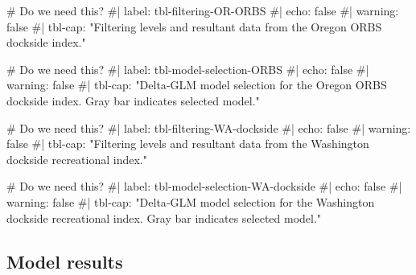 \documentclass[
]{scrartcl}
\newenvironment{Shaded}{\begin{snugshade}}{\end{snugshade}}
\newcommand{\CommentTok}[1]{\textcolor[rgb]{0.37,0.37,0.37}{#1}}
\begin{document}
\begin{Shaded}
\begin{Highlighting}[]
\CommentTok{\# Do we need this?}
\CommentTok{\#| label: tbl{-}filtering{-}OR{-}ORBS}
\CommentTok{\#| echo: false}
\CommentTok{\#| warning: false}
\CommentTok{\#| tbl{-}cap: "Filtering levels and resultant data from the Oregon ORBS dockside index."}
\end{Highlighting}
\end{Shaded}

\begin{Shaded}
\begin{Highlighting}[]
\CommentTok{\# Do we need this?}
\CommentTok{\#| label: tbl{-}model{-}selection{-}ORBS}
\CommentTok{\#| echo: false}
\CommentTok{\#| warning: false}
\CommentTok{\#| tbl{-}cap: "Delta{-}GLM model selection for the Oregon ORBS dockside index. Gray bar indicates selected model."}
\end{Highlighting}
\end{Shaded}

\begin{Shaded}
\begin{Highlighting}[]
\CommentTok{\# Do we need this?}
\CommentTok{\#| label: tbl{-}filtering{-}WA{-}dockside}
\CommentTok{\#| echo: false}
\CommentTok{\#| warning: false}
\CommentTok{\#| tbl{-}cap: "Filtering levels and resultant data from the Washington dockside recreational index."}
\end{Highlighting}
\end{Shaded}

\begin{Shaded}
\begin{Highlighting}[]
\CommentTok{\# Do we need this?}
\CommentTok{\#| label: tbl{-}model{-}selection{-}WA{-}dockside}
\CommentTok{\#| echo: false}
\CommentTok{\#| warning: false}
\CommentTok{\#| tbl{-}cap: "Delta{-}GLM model selection for the Washington dockside recreational index. Gray bar indicates selected model."}
\end{Highlighting}
\end{Shaded}

\subsection{Model results}\label{model-results}

\begingroup
\fontsize{9.0pt}{10.8pt}\selectfont
\end{document}
